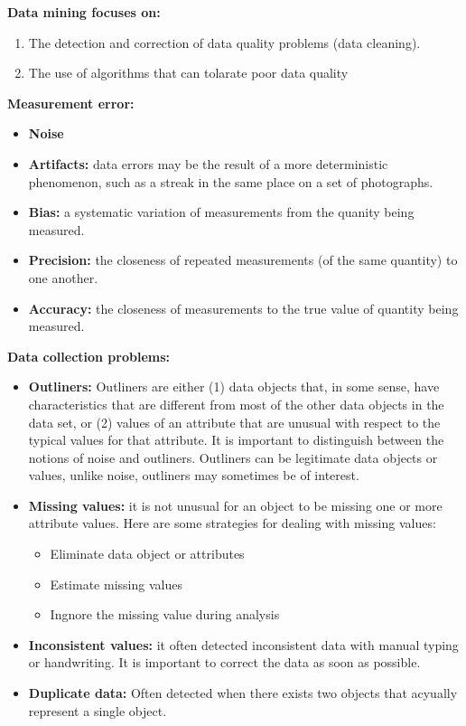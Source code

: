 	{\bf Data mining focuses on:}
	\begin{enumerate}
		\item The detection and correction of data quality problems (data cleaning).
		\item The use of algorithms that can tolarate poor data quality
	\end{enumerate}

	{\bf Measurement error:}
		\begin{itemize}
			\item {\bf Noise}
			\item {\bf Artifacts:} data errors may be the result of a more deterministic
			phenomenon, such as a streak in the same place on a set of photographs.
			\item {\bf Bias:} a systematic variation of measurements from the quanity
			being measured. 
			\item {\bf Precision:} the closeness of repeated measurements (of the
			same quantity) to one another.
			\item {\bf Accuracy:} the closeness of measurements to the true value
			of quantity being measured.
		\end{itemize}

	{\bf Data collection problems:}
		\begin{itemize}
			\item {\bf Outliners:} Outliners are either (1) data objects that, in some
			sense, have characteristics that are different from most of the other data
			objects in the data set, or (2) values of an attribute that are unusual with
			respect to the typical values for that attribute. It is important to distinguish
			between the notions of noise and outliners. Outliners can be legitimate data
			objects or values, unlike noise, outliners may sometimes be of interest. 
			\item {\bf Missing values:} it is not unusual for an object to be missing one 
			or more attribute values. Here are some strategies for dealing with missing values:
				\begin{itemize}
					\item Eliminate data object or attributes
					\item Estimate missing values
					\item Ingnore the missing value during analysis
				\end{itemize}
			\item {\bf Inconsistent values:} it often detected inconsistent data with manual
			typing or handwriting. It is important to correct the data as soon as possible.
			\item {\bf Duplicate data:} Often detected when there exists two objects that 
			acyually represent a single object. 
		\end{itemize}

